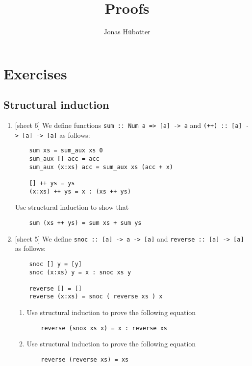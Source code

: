 \documentclass{article}
\title{Proofs}
\author{Jonas Hübotter}
\def\code#1{\texttt{#1}}
\begin{document}
\maketitle

\section{Exercises}

\subsection{Structural induction}
\begin{enumerate}
    \item {[sheet 6]} We define functions \code{sum :: Num a => [a] -> a} and \code{(++) :: [a] -> [a] -> [a]} as follows:
        \begin{verbatim}
    sum xs = sum_aux xs 0
    sum_aux [] acc = acc
    sum_aux (x:xs) acc = sum_aux xs (acc + x)

    [] ++ ys = ys
    (x:xs) ++ ys = x : (xs ++ ys)
        \end{verbatim}
        Use structural induction to show that
        \begin{verbatim}
    sum (xs ++ ys) = sum xs + sum ys
        \end{verbatim}

    \item {[sheet 5]} We define \code{snoc :: [a] -> a -> [a]} and \code{reverse :: [a] -> [a]} as follows:
        \begin{verbatim}
    snoc [] y = [y]
    snoc (x:xs) y = x : snoc xs y

    reverse [] = []
    reverse (x:xs) = snoc ( reverse xs ) x
        \end{verbatim}
        \begin{enumerate}
            \item Use structural induction to prove the following equation
                \begin{verbatim}
    reverse (snox xs x) = x : reverse xs
                \end{verbatim}
            \item Use structural induction to prove the following equation
                \begin{verbatim}
    reverse (reverse xs) = xs
                \end{verbatim}
        \end{enumerate}


\end{enumerate}
\end{document}
